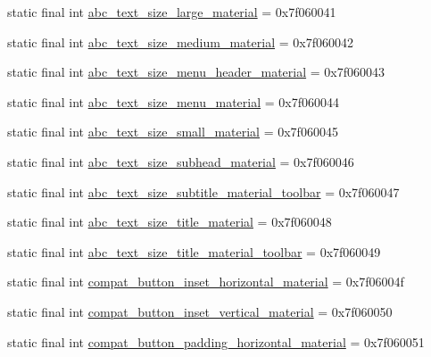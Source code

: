\begin{DoxyCompactItemize}
static final int \mbox{\hyperlink{classandroid_1_1support_1_1design_1_1R_1_1dimen_af1d4e99b6a3ce4f2fb3ba72c6b953412}{abc\+\_\+text\+\_\+size\+\_\+large\+\_\+material}} = 0x7f060041
\item 
static final int \mbox{\hyperlink{classandroid_1_1support_1_1design_1_1R_1_1dimen_a6479afaabebd9416c3403c54b0f5bd59}{abc\+\_\+text\+\_\+size\+\_\+medium\+\_\+material}} = 0x7f060042
\item 
static final int \mbox{\hyperlink{classandroid_1_1support_1_1design_1_1R_1_1dimen_ad9d7d21903709ee861bf41444d421972}{abc\+\_\+text\+\_\+size\+\_\+menu\+\_\+header\+\_\+material}} = 0x7f060043
\item 
static final int \mbox{\hyperlink{classandroid_1_1support_1_1design_1_1R_1_1dimen_a03965514ad78473ff07b5eba8191081b}{abc\+\_\+text\+\_\+size\+\_\+menu\+\_\+material}} = 0x7f060044
\item 
static final int \mbox{\hyperlink{classandroid_1_1support_1_1design_1_1R_1_1dimen_a8a4fb3e596b4b3a400c7623b71bf5ff3}{abc\+\_\+text\+\_\+size\+\_\+small\+\_\+material}} = 0x7f060045
\item 
static final int \mbox{\hyperlink{classandroid_1_1support_1_1design_1_1R_1_1dimen_aebb837455075fb116b55f1e630d32dd5}{abc\+\_\+text\+\_\+size\+\_\+subhead\+\_\+material}} = 0x7f060046
\item 
static final int \mbox{\hyperlink{classandroid_1_1support_1_1design_1_1R_1_1dimen_a2c3b879fdd2573d992fedf97f0e2295b}{abc\+\_\+text\+\_\+size\+\_\+subtitle\+\_\+material\+\_\+toolbar}} = 0x7f060047
\item 
static final int \mbox{\hyperlink{classandroid_1_1support_1_1design_1_1R_1_1dimen_abbfc491717374b99ef03c57688c58ec0}{abc\+\_\+text\+\_\+size\+\_\+title\+\_\+material}} = 0x7f060048
\item 
static final int \mbox{\hyperlink{classandroid_1_1support_1_1design_1_1R_1_1dimen_a7f3928a1b96bdd9950713ed0212b419a}{abc\+\_\+text\+\_\+size\+\_\+title\+\_\+material\+\_\+toolbar}} = 0x7f060049
\item 
static final int \mbox{\hyperlink{classandroid_1_1support_1_1design_1_1R_1_1dimen_a163188ceb5909a90a9fb00792cf24eb5}{compat\+\_\+button\+\_\+inset\+\_\+horizontal\+\_\+material}} = 0x7f06004f
\item 
static final int \mbox{\hyperlink{classandroid_1_1support_1_1design_1_1R_1_1dimen_a469cb854a366414b9c4e40014d8d26ce}{compat\+\_\+button\+\_\+inset\+\_\+vertical\+\_\+material}} = 0x7f060050
\item 
static final int \mbox{\hyperlink{classandroid_1_1support_1_1design_1_1R_1_1dimen_acc77a2bb0fa27443546ec1629a172e1a}{compat\+\_\+button\+\_\+padding\+\_\+horizontal\+\_\+material}} = 0x7f060051

\end{DoxyCompactItemize}
